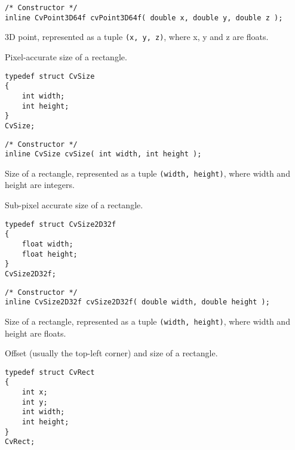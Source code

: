 \begin{lstlisting}
/* Constructor */
inline CvPoint3D64f cvPoint3D64f( double x, double y, double z );
\end{lstlisting}
\else %
3D point, represented as a tuple \texttt{(x, y, z)}, where x, y and z are floats.
\fi %

\label{CvSize}
Pixel-accurate size of a rectangle.

\ifC %
\begin{lstlisting}
typedef struct CvSize
{
    int width; 
    int height; 
}
CvSize;
\end{lstlisting}

\begin{description}
\end{description}

\begin{lstlisting}
/* Constructor */
inline CvSize cvSize( int width, int height );
\end{lstlisting}
\else %
Size of a rectangle, represented as a tuple \texttt{(width, height)}, where width and height are integers.
\fi %

\label{CvSize2D32f}
Sub-pixel accurate size of a rectangle.

\ifC %
\begin{lstlisting}
typedef struct CvSize2D32f
{
    float width; 
    float height; 
}
CvSize2D32f;
\end{lstlisting}

\begin{description}
\end{description}

\begin{lstlisting}
/* Constructor */
inline CvSize2D32f cvSize2D32f( double width, double height );
\end{lstlisting}
\else %
Size of a rectangle, represented as a tuple \texttt{(width, height)}, where width and height are floats.
\fi %

\label{CvRect}
Offset (usually the top-left corner) and size of a rectangle.

\ifC %
\begin{lstlisting}
typedef struct CvRect
{
    int x; 
    int y; 
    int width; 
    int height; 
}
CvRect;
\end{lstlisting}

